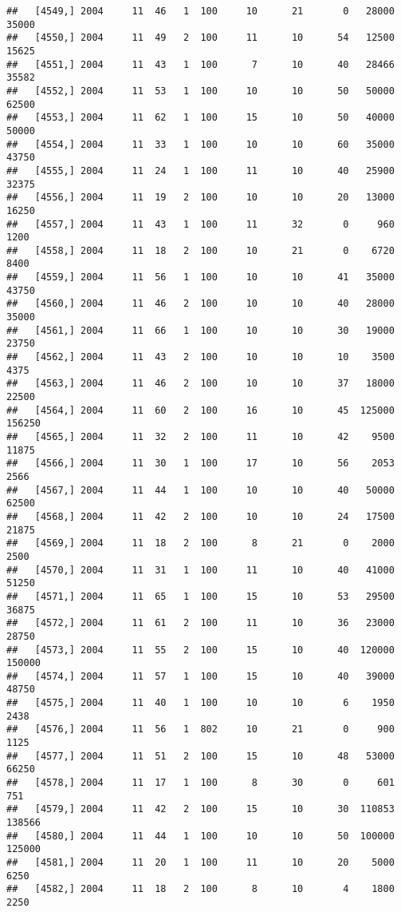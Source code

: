 \documentclass{article}\usepackage[]{graphicx}\usepackage[]{color}
\makeatletter
\newenvironment{kframe}{%
 \def\at@end@of@kframe{}%
 \ifinner\ifhmode%
  \def\at@end@of@kframe{\end{minipage}}%
  \begin{minipage}{\columnwidth}%
 \fi\fi%
 \def\FrameCommand##1{\hskip\@totalleftmargin \hskip-\fboxsep
 \colorbox{shadecolor}{##1}\hskip-\fboxsep
     \hskip-\linewidth \hskip-\@totalleftmargin \hskip\columnwidth}%
 \MakeFramed {\advance\hsize-\width
   \@totalleftmargin\z@ \linewidth\hsize
   \@setminipage}}%
 {\par\unskip\endMakeFramed%
 \at@end@of@kframe}
\newenvironment{knitrout}{}{} %
\makeatother
\begin{document}
\begin{knitrout}
\begin{kframe}
\begin{verbatim}
##   [4549,] 2004     11  46   1  100     10      21       0   28000   35000
##   [4550,] 2004     11  49   2  100     11      10      54   12500   15625
##   [4551,] 2004     11  43   1  100      7      10      40   28466   35582
##   [4552,] 2004     11  53   1  100     10      10      50   50000   62500
##   [4553,] 2004     11  62   1  100     15      10      50   40000   50000
##   [4554,] 2004     11  33   1  100     10      10      60   35000   43750
##   [4555,] 2004     11  24   1  100     11      10      40   25900   32375
##   [4556,] 2004     11  19   2  100     10      10      20   13000   16250
##   [4557,] 2004     11  43   1  100     11      32       0     960    1200
##   [4558,] 2004     11  18   2  100     10      21       0    6720    8400
##   [4559,] 2004     11  56   1  100     10      10      41   35000   43750
##   [4560,] 2004     11  46   2  100     10      10      40   28000   35000
##   [4561,] 2004     11  66   1  100     10      10      30   19000   23750
##   [4562,] 2004     11  43   2  100     10      10      10    3500    4375
##   [4563,] 2004     11  46   2  100     10      10      37   18000   22500
##   [4564,] 2004     11  60   2  100     16      10      45  125000  156250
##   [4565,] 2004     11  32   2  100     11      10      42    9500   11875
##   [4566,] 2004     11  30   1  100     17      10      56    2053    2566
##   [4567,] 2004     11  44   1  100     10      10      40   50000   62500
##   [4568,] 2004     11  42   2  100     10      10      24   17500   21875
##   [4569,] 2004     11  18   2  100      8      21       0    2000    2500
##   [4570,] 2004     11  31   1  100     11      10      40   41000   51250
##   [4571,] 2004     11  65   1  100     15      10      53   29500   36875
##   [4572,] 2004     11  61   2  100     11      10      36   23000   28750
##   [4573,] 2004     11  55   2  100     15      10      40  120000  150000
##   [4574,] 2004     11  57   1  100     15      10      40   39000   48750
##   [4575,] 2004     11  40   1  100     10      10       6    1950    2438
##   [4576,] 2004     11  56   1  802     10      21       0     900    1125
##   [4577,] 2004     11  51   2  100     15      10      48   53000   66250
##   [4578,] 2004     11  17   1  100      8      30       0     601     751
##   [4579,] 2004     11  42   2  100     15      10      30  110853  138566
##   [4580,] 2004     11  44   1  100     10      10      50  100000  125000
##   [4581,] 2004     11  20   1  100     11      10      20    5000    6250
##   [4582,] 2004     11  18   2  100      8      10       4    1800    2250

\end{verbatim}
\end{kframe}
\end{knitrout}
\end{document}
